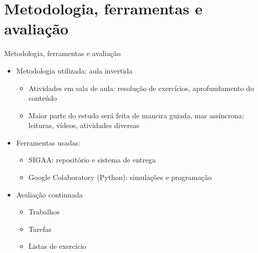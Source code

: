   \section[ slide = true]{Metodologia, ferramentas e avaliação}
      \begin{slide}[toc=]{Metodologia, ferramentas e avaliação}
         \begin{itemize}
	    \item Metodologia utilizada: aula invertida  
		    \begin{itemize}
			    \item Atividades em sala de aula: resolução de exercícios, aprofundamento do conteúdo
			    \item Maior parte do estudo será feita de maneira guiada, mas assíncrona: leituras, vídeos, atividades diversas
		    \end{itemize}
	    \item Ferramentas usadas:
		    \begin{itemize}
			    \item SIGAA: repositório e sistema de entrega
			    \item Google Colaboratory (Python): simulações e programação 
		    \end{itemize}

            \item Avaliação continuada
            \begin{itemize}
               \item Trabalhos 
               \item Tarefas 
	       \item Listas de exercício
	    \end{itemize}
	 \end{itemize}
      \end{slide}


